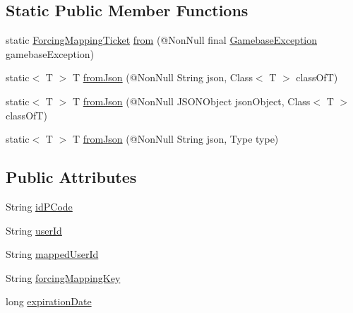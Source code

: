 \subsection*{Static Public Member Functions}
\begin{DoxyCompactItemize}
\item 
static \hyperlink{classcom_1_1toast_1_1android_1_1gamebase_1_1auth_1_1mapping_1_1data_1_1_forcing_mapping_ticket}{Forcing\+Mapping\+Ticket} \hyperlink{classcom_1_1toast_1_1android_1_1gamebase_1_1auth_1_1mapping_1_1data_1_1_forcing_mapping_ticket_a770bb84dc52dc616a34508e81d82955a}{from} (@Non\+Null final \hyperlink{classcom_1_1toast_1_1android_1_1gamebase_1_1base_1_1_gamebase_exception}{Gamebase\+Exception} gamebase\+Exception)
\item 
static$<$ T $>$ T \hyperlink{classcom_1_1toast_1_1android_1_1gamebase_1_1base_1_1_value_object_ae6655c88c20a9a8406dc11b46250ac7b}{from\+Json} (@Non\+Null String json, Class$<$ T $>$ class\+OfT)
\item 
static$<$ T $>$ T \hyperlink{classcom_1_1toast_1_1android_1_1gamebase_1_1base_1_1_value_object_ab83c4196ee2e3f11553bbe0f04dc2101}{from\+Json} (@Non\+Null J\+S\+O\+N\+Object json\+Object, Class$<$ T $>$ class\+OfT)
\item 
static$<$ T $>$ T \hyperlink{classcom_1_1toast_1_1android_1_1gamebase_1_1base_1_1_value_object_aa901d97d495150b54bcb80c05672f58a}{from\+Json} (@Non\+Null String json, Type type)
\end{DoxyCompactItemize}
\subsection*{Public Attributes}
\begin{DoxyCompactItemize}
\item 
String \hyperlink{classcom_1_1toast_1_1android_1_1gamebase_1_1auth_1_1mapping_1_1data_1_1_forcing_mapping_ticket_a8a7650807822fdc99f74fdfc92c7055c}{id\+P\+Code}
\item 
String \hyperlink{classcom_1_1toast_1_1android_1_1gamebase_1_1auth_1_1mapping_1_1data_1_1_forcing_mapping_ticket_ae9d0b602f581392f4e9a08d579632b94}{user\+Id}
\item 
String \hyperlink{classcom_1_1toast_1_1android_1_1gamebase_1_1auth_1_1mapping_1_1data_1_1_forcing_mapping_ticket_a30bfe38b258499ecc610c1d1dc5a3095}{mapped\+User\+Id}
\item 
String \hyperlink{classcom_1_1toast_1_1android_1_1gamebase_1_1auth_1_1mapping_1_1data_1_1_forcing_mapping_ticket_a3b44cbeaa9c36c1e000261dbf8e621e2}{forcing\+Mapping\+Key}
\item 
long \hyperlink{classcom_1_1toast_1_1android_1_1gamebase_1_1auth_1_1mapping_1_1data_1_1_forcing_mapping_ticket_a7fd6bc57285184877bc741714381e0a6}{expiration\+Date}
\end{DoxyCompactItemize}
